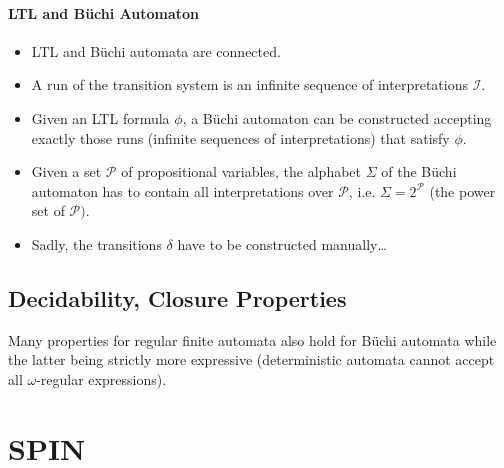 			\subsubsection{LTL and Büchi Automaton}
				\begin{itemize}
					\item LTL and Büchi automata are connected.
					\item A run of the transition system is an infinite sequence of interpretations \(\mathcal{I}\).
					\item Given an LTL formula \(\phi\), a Büchi automaton can be constructed accepting exactly those runs (infinite sequences of interpretations) that satisfy \(\phi\).
					\item Given a set \(\mathcal{P}\) of propositional variables, the alphabet \(\Sigma\) of the Büchi automaton has to contain all interpretations over \(\mathcal{P}\), i.e. \(\Sigma = 2^\mathcal{P}\) (the power set of \(\mathcal{P})\).
					\item Sadly, the transitions \(\delta\) have to be constructed manually\dots
				\end{itemize}

	\section{Decidability, Closure Properties}
		Many properties for regular finite automata also hold for Büchi automata while the latter being strictly more expressive (deterministic automata cannot accept all \(\omega\)-regular expressions).



\chapter{SPIN}
\label{c:spin}

